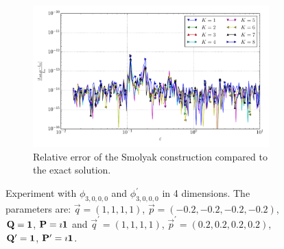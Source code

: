 \documentclass[a4paper,10pt]{article}
\begin{document}
\begin{figure}[ht!]
\begin{subfigure}[t]{0.5\linewidth}
    \includegraphics[width=\linewidth]{./plots/tp_sg_4d_conv_eps_(3,0,0,0)_(3,0,0,0)_err_rel_nsd_gk.pdf}
    \caption{Relative error of the Smolyak construction compared to the exact solution.}
    \label{fig:tp_sg_4d_conv_p_3000_3000_err_rel_nsd_gk}
  \end{subfigure}
  \label{fig:tp_sg_4d_conv_p_3000_3000}
  \caption{Experiment with $\phi_{3,0,0,0}$ and $\phi_{3,0,0,0}^{\prime}$
  in 4 dimensions.
  The parameters are:
  $\vec{q} = (1, 1, 1, 1)$,
  $\vec{p} = (-0.2, -0.2, -0.2, -0.2)$,
  $\mathbf{Q} = \mathbf{1}$,
  $\mathbf{P} = \imath \mathbf{1}$
  and
  $\vec{q}^\prime = (1, 1, 1, 1)$,
  $\vec{p}^\prime = (0.2, 0.2, 0.2, 0.2)$,
  $\mathbf{Q}^\prime = \mathbf{1}$,
  $\mathbf{P}^\prime = \imath \mathbf{1}$.}
\end{figure}
\end{document}
